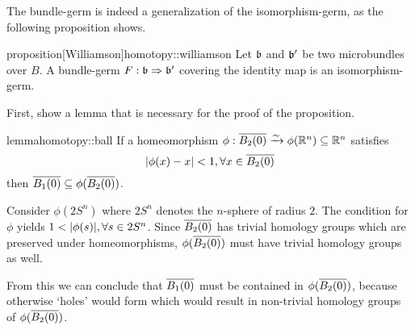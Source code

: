 \begin{myparagraph}
    The bundle-germ is indeed a generalization of the isomorphism-germ,
    as the following proposition shows.
\end{myparagraph}

\begin{mystatement}{proposition}[Williamson]{homotopy::williamson}
    Let $\bb$ and $\bb'$ be two microbundles over $B$.
    A bundle-germ $\germdef{F}{\bb}{\bb'}$ covering the identity map is an isomorphism-germ.
\end{mystatement}

\begin{myparagraph}
    First, show a lemma that is necessary for the proof of the proposition.
\end{myparagraph}

\begin{mystatement}{lemma}{homotopy::ball}
    If a homeomorphism $\phi: \clball[2] \isomto \phi(\R^n) \sub \R^n$ satisfies
    \[ \abs{\phi(x) - x} < 1, \forall x \in \clball[2] \]
    then $\clball[1] \sub \phi(\clball[2])$.
\end{mystatement}

\begin{myproof}
    Consider $\phi(2S^n)$ where $2S^n$ denotes the $n$-sphere of radius $2$.
    The condition for $\phi$ yields $1 < \vert{} \phi(s) \vert{}, \forall s \in 2S^n$.
    Since $\clball[2]$ has trivial homology groups which are preserved under homeomorphisms,
    $\phi(\clball[2])$ must have trivial homology groups as well.

    From this we can conclude that $\clball[1]$ must be contained in $\phi(\clball[2])$,
    because otherwise `holes' would form which would result in non-trivial homology groups of $\phi(\clball[2])$.
\end{myproof}

